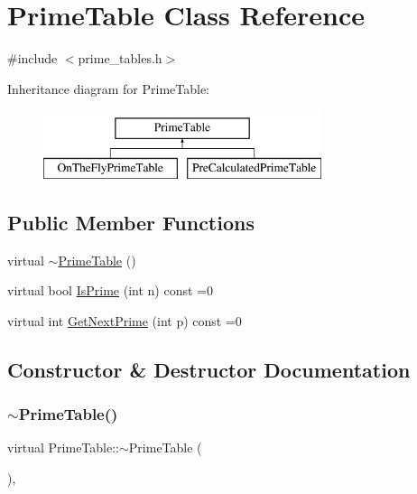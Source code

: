 \hypertarget{classPrimeTable}{}\section{Prime\+Table Class Reference}
\label{classPrimeTable}


{\ttfamily \#include $<$prime\+\_\+tables.\+h$>$}

Inheritance diagram for Prime\+Table\+:\begin{figure}[H]
\begin{center}
\leavevmode
\includegraphics[height=2.000000cm]{classPrimeTable}
\end{center}
\end{figure}
\subsection*{Public Member Functions}
\begin{DoxyCompactItemize}
\item 
virtual \mbox{\hyperlink{classPrimeTable_af2cdea4896fd86a42b4dfd5e5027d640}{$\sim$\+Prime\+Table}} ()
\item 
virtual bool \mbox{\hyperlink{classPrimeTable_a2ab9243364ded0c51541f641b2df362a}{Is\+Prime}} (int n) const =0
\item 
virtual int \mbox{\hyperlink{classPrimeTable_ae537c939f56617d8937d57bbbae3ab30}{Get\+Next\+Prime}} (int p) const =0
\end{DoxyCompactItemize}


\subsection{Constructor \& Destructor Documentation}
\mbox{\label{classPrimeTable_af2cdea4896fd86a42b4dfd5e5027d640}} 
\subsubsection{\texorpdfstring{$\sim$PrimeTable()}{~PrimeTable()}}
{\footnotesize\ttfamily virtual Prime\+Table\+::$\sim$\+Prime\+Table (\begin{DoxyParamCaption}{ }\end{DoxyParamCaption})\hspace{0.3cm}{\ttfamily [inline]}, {\ttfamily [virtual]}}



